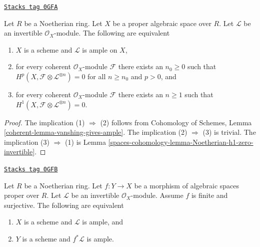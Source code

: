 \begin{lemma}
\label{spaces-cohomology-lemma-vanshing-gives-ample}
\href{https://stacks.math.columbia.edu/tag/0GFA}{\texttt{Stacks tag 0GFA}}

Let $R$ be a Noetherian ring. Let $X$ be a proper algebraic space
over $R$. Let $\mathcal{L}$ be an invertible $\mathcal{O}_X$-module.
The following are equivalent
\begin{enumerate}
\item $X$ is a scheme and $\mathcal{L}$ is ample on $X$,
\item for every coherent $\mathcal{O}_X$-module $\mathcal{F}$ there exists
an $n_0 \geq 0$ such that
$H^p(X, \mathcal{F} \otimes \mathcal{L}^{\otimes n}) = 0$ for all $n \geq n_0$
and $p > 0$, and
\item for every coherent $\mathcal{O}_X$-module $\mathcal{F}$ there exists
an $n \geq 1$ such that
$H^1(X, \mathcal{F} \otimes \mathcal{L}^{\otimes n}) = 0$.
\end{enumerate}
\end{lemma}

\begin{proof}
The implication (1) $\Rightarrow$ (2) follows from
Cohomology of Schemes, Lemma \ref{coherent-lemma-vanshing-gives-ample}.
The implication (2) $\Rightarrow$ (3) is trivial.
The implication (3) $\Rightarrow$ (1) is
Lemma \ref{spaces-cohomology-lemma-Noetherian-h1-zero-invertible}.
\end{proof}

\begin{lemma}
\label{spaces-cohomology-lemma-surjective-finite-morphism-ample}
\href{https://stacks.math.columbia.edu/tag/0GFB}{\texttt{Stacks tag 0GFB}}

Let $R$ be a Noetherian ring. Let $f : Y \to X$ be a morphism of
algebraic spaces proper over $R$. Let $\mathcal{L}$ be an
invertible $\mathcal{O}_X$-module. Assume $f$ is finite and surjective.
The following are equivalent
\begin{enumerate}
\item $X$ is a scheme and $\mathcal{L}$ is ample, and
\item $Y$ is a scheme and $f^*\mathcal{L}$ is ample.
\end{enumerate}
\end{lemma}

